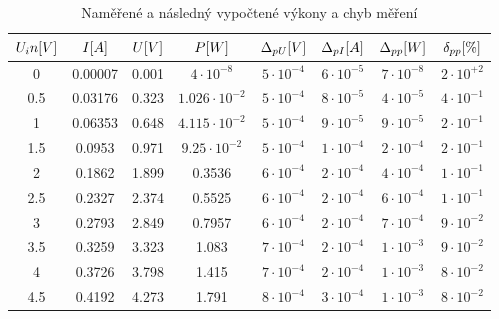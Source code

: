 \documentclass{article}
\begin{document}
\begin{table}[H]
    \centering
    \caption{\label{tabulka_mereni} Naměřené a následný vypočtené výkony a chyb měření}
    \begin{tabular}{|c|c|c|c|c|c|c|c|}
        \hline
        \(U_in\-[V]\) &	\(I\-[A]\) &	\(U\-[V]\) & \(P\-[W]\)             & \(\Delta_{pU}\-[V]\)    & \(\Delta_{pI}\-[A]\)  & \(\Delta_{pp}\-[W]\)  & \(\delta_{pp}\-[\%]\) \\ \hline
        0	            & 0.00007	   &    0.001	   & \(4     \cdot10^{-8}\) & \(5\cdot10^{-4}\)       & \(6\cdot10^{-5}\)     & \(7\cdot10^{-8}\)     & \(2\cdot10^{+2}\)     \\ \hline
        0.5	          & 0.03176	   &    0.323	   & \(1.026 \cdot10^{-2}\) & \(5\cdot10^{-4}\)       & \(8\cdot10^{-5}\)     & \(4\cdot10^{-5}\)     & \(4\cdot10^{-1}\)     \\ \hline
        1	            & 0.06353	   &    0.648	   & \(4.115 \cdot10^{-2}\) & \(5\cdot10^{-4}\)       & \(9\cdot10^{-5}\)     & \(9\cdot10^{-5}\)     & \(2\cdot10^{-1}\)     \\ \hline
        1.5	          & 0.0953	   &    0.971	   & \(9.25  \cdot10^{-2}\) & \(5\cdot10^{-4}\)       & \(1\cdot10^{-4}\)     & \(2\cdot10^{-4}\)     & \(2\cdot10^{-1}\)     \\ \hline
        2	            & 0.1862	   &    1.899	   & 0.3536                 & \(6\cdot10^{-4}\)       & \(2\cdot10^{-4}\)     & \(4\cdot10^{-4}\)     & \(1\cdot10^{-1}\)     \\ \hline
        2.5	          & 0.2327	   &    2.374	   & 0.5525                 & \(6\cdot10^{-4}\)       & \(2\cdot10^{-4}\)     & \(6\cdot10^{-4}\)     & \(1\cdot10^{-1}\)     \\ \hline
        3  	          & 0.2793	   &    2.849	   & 0.7957                 & \(6\cdot10^{-4}\)       & \(2\cdot10^{-4}\)     & \(7\cdot10^{-4}\)     & \(9\cdot10^{-2}\)     \\ \hline
        3.5	          & 0.3259	   &    3.323	   & 1.083                  & \(7\cdot10^{-4}\)       & \(2\cdot10^{-4}\)     & \(1\cdot10^{-3}\)     & \(9\cdot10^{-2}\)     \\ \hline
        4	            & 0.3726	   &    3.798	   & 1.415                  & \(7\cdot10^{-4}\)       & \(2\cdot10^{-4}\)     & \(1\cdot10^{-3}\)     & \(8\cdot10^{-2}\)     \\ \hline
        4.5	          & 0.4192	   &    4.273	   & 1.791                  & \(8\cdot10^{-4}\)       & \(3\cdot10^{-4}\)     & \(1\cdot10^{-3}\)     & \(8\cdot10^{-2}\)     \\ \hline

\end{tabular}
\end{table}
\end{document}
